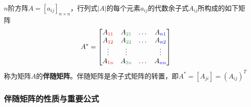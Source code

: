 \documentclass[./linear_algebra.tex]{subfiles}
\begin{document}
    $n$阶方阵$A = [a_{ij}]_{n \times n}$，行列式$|A|$的每个元素$a_{ij}$的代数余子式$A_{ij}$所构成的如下矩阵
    \[
        A^* =
        \begin{bmatrix}
            A_{\color{red}{11}} & A_{\textcolor[rgb]{0.2, 0.6, 0.3}{21}} & \dots & A_{\textcolor{blue}{n1}} \\
            A_{\color{red}{12}} & A_{\textcolor[rgb]{0.2, 0.6, 0.3}{22}} & \dots & A_{\textcolor{blue}{n2}} \\
            \vdots              & \vdots                                 &       & \vdots                   \\
            A_{\color{red}{1n}} & A_{\textcolor[rgb]{0.2, 0.6, 0.3}{2n}} & \dots & A_{\textcolor{blue}{nn}}
        \end{bmatrix}
    \]
    称为矩阵$A$的\textbf{伴随矩阵}。伴随矩阵是余子式矩阵的转置，即$A^* = [A_{ji}] = (A_{ij})^T$

    \subsubsection{伴随矩阵的性质与重要公式}
\end{document}

